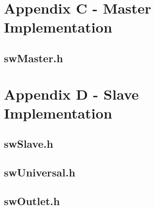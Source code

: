 \documentclass[12pt]{article}
\begin{document}
\pagebreak

\section{Appendix C - Master Implementation}
\label{sec:AppendixC}

\pagebreak

\subsection{swMaster.h}
\label{sec:AppendixC.swMaster.h}


\pagebreak

\section{Appendix D - Slave Implementation}
\label{sec:AppendixD}

\pagebreak

\subsection{swSlave.h}
\label{sec:AppendixD.swSlave.h}


\pagebreak

\subsection{swUniversal.h}
\label{sec:AppendixD.swUniversal.h}


\pagebreak

\subsection{swOutlet.h}
\label{sec:AppendixD.swOutlet.h}


\pagebreak
\end{document}
